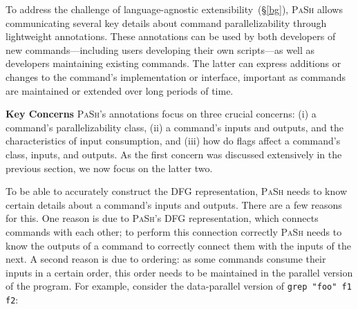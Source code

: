\documentclass[sigplan, review, screen, anonymous]{acmart}
\newcommand{\heading}[1]{\vspace{4pt}\noindent\textbf{#1}\enspace}
\newcommand{\ttt}[1]{\texttt{#1}}
\newcommand{\nv}[1]{[{\color{cyan}nv: #1}]}
\newcommand{\kk}[1]{[{\color{magenta}kk: #1}]}
\newcommand{\sx}[1]{(\S\ref{#1})}
\newcommand{\sys}{{\scshape PaSh}\xspace}
\newcommand{\unix}{{\scshape Unix}\xspace}
\begin{document}

To address the challenge of language-agnostic extensibility~\sx{bg}, \sys allows communicating several key details about command parallelizability through lightweight annotations.
These annotations can be used by both developers of new commands---including users developing their own scripts---as well as developers maintaining existing commands.
The latter can express additions or changes to the command's implementation or interface, important as commands are maintained or extended over long periods of time.

\heading{Key Concerns}
\sys's annotations focus on three crucial concerns:
  (i) a command's parallelizability class,
  (ii) a command's inputs and outputs, and the characteristics of input consumption, and
  (iii) how do flags affect a command's class, inputs, and outputs.
As the first concern was discussed extensively in the previous section, we now focus on the latter two.

To be able to accurately construct the DFG representation, \sys needs to know certain details about a command's inputs and outputs.
There are a few reasons for this.
One reason is due to \sys's DFG representation, which connects commands with each other;
  to perform this connection correctly \sys needs to know the outputs of a command to correctly connect them with the inputs of the next.
A second reason is due to ordering:
  as some commands consume their inputs in a certain order, this order needs to be maintained in the parallel version of the program.
For example, consider the data-parallel version of \ttt{grep "foo" f1 f2}:
\end{document}
